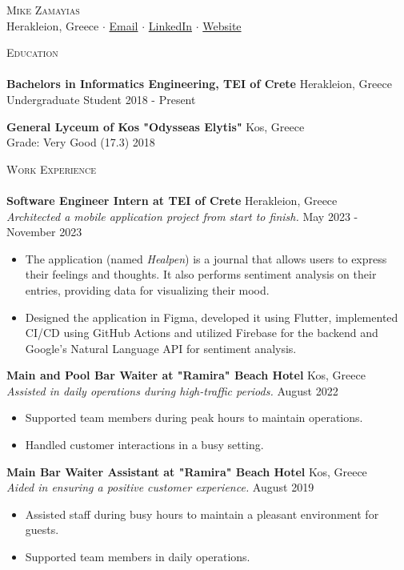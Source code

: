 \documentclass[a4paper, 11pt]{article}
\newcommand{\lineunder} {
	\vspace*{-8pt} \\
	\hspace*{-18pt} \hrulefill \\
}
\newcommand{\header} [1] {
	\vspace*{2mm}
	{\hspace*{-18pt}\vspace*{6pt} \textsc{#1}}
	\vspace*{-6pt} \lineunder
}
\newcommand{\education}[4]{ %
	\textbf{#1} \hfill #3 \\ %
	#2 \hfill #4 \\ %
	\vspace*{2mm}
}
\newcommand{\workexperience}[5]{ %
	\textbf{#1} \hfill #2 \\ %
	\textit{#3} \hfill #4 \\ %
	#5 %
	\vspace*{2mm}
}
\newcommand{\socialmediabutton}[2]{%
	\href{#1}{#2}
}
\begin{document}
\vspace*{-40pt}


\begin{center}
	{\Huge \scshape {Mike Zamayias}}\\
	Herakleion, Greece $\cdot$ \socialmediabutton{mailto:contact@mikezamayias.com}{Email} $\cdot$ \socialmediabutton{https://linkedin.com/in/mikezamayias}{LinkedIn} $\cdot$ \socialmediabutton{https://mikezamayias.com}{Website}
\end{center}


\header{Education}
\education
{Bachelors in Informatics Engineering, TEI of Crete}
{Undergraduate Student}
{Herakleion, Greece}
{2018 -  Present}
\education
{General Lyceum of Kos "Odysseas Elytis"}
{Grade: Very Good (17.3)}
{Kos, Greece}
{2018}


\header{Work Experience}
\workexperience
{Software Engineer Intern at TEI of Crete}
{Herakleion, Greece}
{Architected a mobile application project from start to finish.}
{May 2023 - November 2023}
{
	\begin{itemize} \itemsep 1pt
		\item The application (named \textit{Healpen}) is a journal that allows users to express their feelings and thoughts. It also performs sentiment analysis on their entries, providing data for visualizing their mood.
		\item Designed the application in Figma, developed it using Flutter, implemented CI/CD using GitHub Actions and utilized Firebase for the backend and Google's Natural Language API for sentiment analysis.
	\end{itemize}
}
\workexperience
{Main and Pool Bar Waiter at "Ramira" Beach Hotel}
{Kos, Greece}
{Assisted in daily operations during high-traffic periods.}
{August 2022}
{
	\begin{itemize} \itemsep 1pt
		\item Supported team members during peak hours to maintain operations.
		\item Handled customer interactions in a busy setting.
	\end{itemize}
}
\workexperience
{Main Bar Waiter Assistant at "Ramira" Beach Hotel}
{Kos, Greece}
{Aided in ensuring a positive customer experience.}
{August 2019}
{
	\begin{itemize} \itemsep 1pt
		\item Assisted staff during busy hours to maintain a pleasant environment for guests.
		\item Supported team members in daily operations.
	\end{itemize}
}
\end{document}
